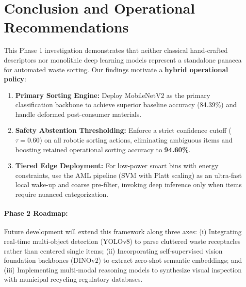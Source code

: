 \documentclass[11pt,a4paper]{article}
\begin{document}
\section{Conclusion and Operational Recommendations}
This Phase 1 investigation demonstrates that neither classical hand-crafted descriptors nor monolithic deep learning models represent a standalone panacea for automated waste sorting. Our findings motivate a \textbf{hybrid operational policy}:
\begin{enumerate}[label=\arabic*.]
    \item \textbf{Primary Sorting Engine:} Deploy MobileNetV2 as the primary classification backbone to achieve superior baseline accuracy (84.39\%) and handle deformed post-consumer materials.
    \item \textbf{Safety Abstention Thresholding:} Enforce a strict confidence cutoff ($\tau = 0.60$) on all robotic sorting actions, eliminating ambiguous items and boosting retained operational sorting accuracy to \textbf{94.60\%}.
    \item \textbf{Tiered Edge Deployment:} For low-power smart bins with energy constraints, use the AML pipeline (SVM with Platt scaling) as an ultra-fast local wake-up and coarse pre-filter, invoking deep inference only when items require nuanced categorization.
\end{enumerate}

\paragraph{Phase 2 Roadmap:} Future development will extend this framework along three axes: (i) Integrating real-time multi-object detection (YOLOv8) to parse cluttered waste receptacles rather than centered single items; (ii) Incorporating self-supervised vision foundation backbones (DINOv2) to extract zero-shot semantic embeddings; and (iii) Implementing multi-modal reasoning models to synthesize visual inspection with municipal recycling regulatory databases.
\end{document}
